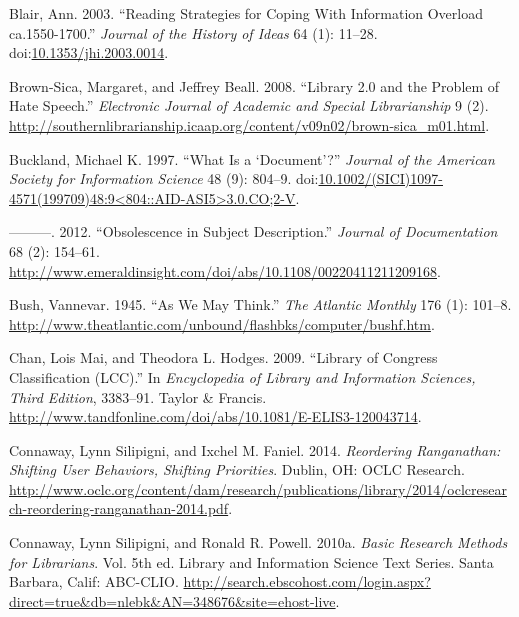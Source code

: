 \documentclass[]{article}
\begin{document}
\hypertarget{ref-blairux5freadingux5f2003}{}
Blair, Ann. 2003. ``Reading Strategies for Coping With Information
Overload ca.1550-1700.'' \emph{Journal of the History of Ideas} 64 (1):
11--28.
doi:\href{https://doi.org/10.1353/jhi.2003.0014}{10.1353/jhi.2003.0014}.

\hypertarget{ref-brown-sicaux5flibraryux5f2008}{}
Brown-Sica, Margaret, and Jeffrey Beall. 2008. ``Library 2.0 and the
Problem of Hate Speech.'' \emph{Electronic Journal of Academic and
Special Librarianship} 9 (2).
\url{http://southernlibrarianship.icaap.org/content/v09n02/brown-sica_m01.html}.

\hypertarget{ref-bucklandux5fwhatux5f1997}{}
Buckland, Michael K. 1997. ``What Is a `Document'?'' \emph{Journal of
the American Society for Information Science} 48 (9): 804--9.
doi:\href{https://doi.org/10.1002/(SICI)1097-4571(199709)48:9\%3C804::AID-ASI5\%3E3.0.CO;2-V}{10.1002/(SICI)1097-4571(199709)48:9\textless{}804::AID-ASI5\textgreater{}3.0.CO;2-V}.

\hypertarget{ref-bucklandux5fobsolescenceux5f2012}{}
---------. 2012. ``Obsolescence in Subject Description.'' \emph{Journal
of Documentation} 68 (2): 154--61.
\url{http://www.emeraldinsight.com/doi/abs/10.1108/00220411211209168}.

\hypertarget{ref-bushux5fasux5f1945}{}
Bush, Vannevar. 1945. ``As We May Think.'' \emph{The Atlantic Monthly}
176 (1): 101--8.
\url{http://www.theatlantic.com/unbound/flashbks/computer/bushf.htm}.

\hypertarget{ref-chanux5flibraryux5f2009}{}
Chan, Lois Mai, and Theodora L. Hodges. 2009. ``Library of Congress
Classification (LCC).'' In \emph{Encyclopedia of Library and Information
Sciences, Third Edition}, 3383--91. Taylor \& Francis.
\url{http://www.tandfonline.com/doi/abs/10.1081/E-ELIS3-120043714}.

\hypertarget{ref-connawayux5freorderingux5f2014}{}
Connaway, Lynn Silipigni, and Ixchel M. Faniel. 2014. \emph{Reordering
Ranganathan: Shifting User Behaviors, Shifting Priorities}. Dublin, OH:
OCLC Research.
\url{http://www.oclc.org/content/dam/research/publications/library/2014/oclcresearch-reordering-ranganathan-2014.pdf}.

\hypertarget{ref-connawayux5fbasicux5f2010}{}
Connaway, Lynn Silipigni, and Ronald R. Powell. 2010a. \emph{Basic
Research Methods for Librarians}. Vol. 5th ed. Library and Information
Science Text Series. Santa Barbara, Calif: ABC-CLIO.
\url{http://search.ebscohost.com/login.aspx?direct=true\&db=nlebk\&AN=348676\&site=ehost-live}.
\end{document}
